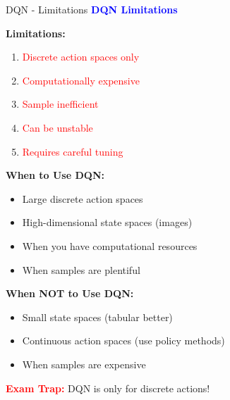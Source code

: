 \documentclass[8pt]{beamer}
\begin{document}
	\begin{frame}{DQN - Limitations}
		\fontsize{6.5}{7.5}\selectfont
		\textcolor{blue}{\textbf{DQN Limitations}}
		
		\textbf{Limitations:}
		\begin{enumerate}
			\item \textcolor{red}{Discrete action spaces only}
			\item \textcolor{red}{Computationally expensive}
			\item \textcolor{red}{Sample inefficient}
			\item \textcolor{red}{Can be unstable}
			\item \textcolor{red}{Requires careful tuning}
		\end{enumerate}
		
		\textbf{When to Use DQN:}
		\begin{itemize}
			\item Large discrete action spaces
			\item High-dimensional state spaces (images)
			\item When you have computational resources
			\item When samples are plentiful
		\end{itemize}
		
		\textbf{When NOT to Use DQN:}
		\begin{itemize}
			\item Small state spaces (tabular better)
			\item Continuous action spaces (use policy methods)
			\item When samples are expensive
		\end{itemize}
		
		\textcolor{red}{\textbf{Exam Trap:}} DQN is only for discrete actions!
	\end{frame}
	
	
\end{document}
